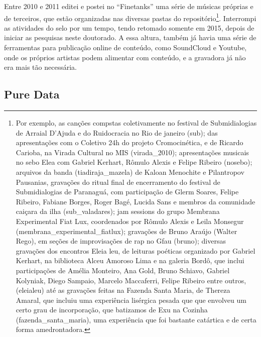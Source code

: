Entre 2010 e 2011 editei e postei no ``Finetanks'' uma série de músicas próprias e de terceiros, que estão organizadas nas diversas pastas do repositório\footnote{ Por exemplo, as canções compstas coletivamente no festival de Submidialogias de Arraial D'Ajuda e do Ruidocracia no Rio de janeiro (\/sub\/); das apresentações com o Coletivo 24h do projeto Cromocinética, e de Ricardo Carioba, na Virada Cultural no MIS (virada\_2010\/); apresentações musicais no sebo Elea com Gabriel Kerhart, Rômulo Alexis e Felipe Ribeiro (nosebo\/); arquivos da banda (tiadiraja\_mazela\/) de Kaloan Menochite e Pilantropov Pausanias, gravações do ritual final de encerramento do festival de Submidialogias de Paranaguá, com participação de Glerm Soares, Felipe Ribeiro, Fabiane Borges, Roger Bagé, Lucida Sans e membros da comunidade caiçara da ilha (\/sub\_valadares\/); jam sessions do grupo Membrana Experimental Fiat Lux, coordenados por Rômulo Alexis e Leila Monsegur (membrana\_experimental\_fiatlux\/); gravações de Bruno Araújo (Walter Rego), em seções de improvisações de rap no Gfau (bruno\/); diversas gravações dos encontros Eleia leu,  de leituras poéticas organizado por Gabriel Kerhart, na biblioteca Alceu Amoroso Lima e na galeria Bordô, que inclui participações de Amélia Monteiro, Ana Gold, Bruno Schiavo, Gabriel Kolyniak, Diego Sampaio, Marcelo Maccaferri, Felipe Ribeiro entre outros, (\/eleialeu\/) até as gravações feitas na Fazenda Santa Maria, de Thereza Amaral, que incluiu uma experiência lisérgica pesada que que envolveu um certo grau de incorporação, que batizamos de Exu na Cozinha (\/fazenda\_santa\_maria\/), uma experiência que foi bastante catártica e de certa forma amedrontadora. }. Interrompi as atividades do selo por um tempo, tendo retomado somente em 2015, depois de iniciar as pesquisas neste doutorado. A essa altura, também já havia uma série de ferramentas para publicação online de conteúdo, como SoundCloud e Youtube, onde os próprios artistas podem alimentar com conteúdo, e a gravadora já não era mais tão necessária.





\subsection{Pure Data}


